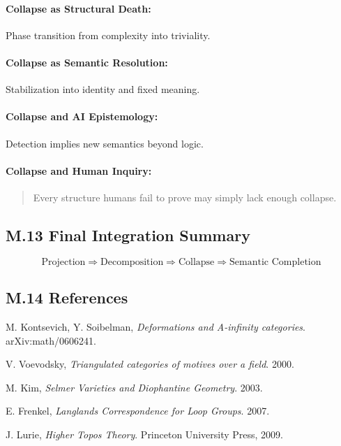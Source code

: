 \documentclass[11pt]{article}
\begin{document}
\begin{axiom}
\begin{axiom}
{{\paragraph{Collapse as Structural Death:}  
Phase transition from complexity into triviality.

\paragraph{Collapse as Semantic Resolution:}  
Stabilization into identity and fixed meaning.

\paragraph{Collapse and AI Epistemology:}  
Detection implies new semantics beyond logic.

\paragraph{Collapse and Human Inquiry:}  
\begin{quote}
Every structure humans fail to prove may simply lack enough collapse.
\end{quote}

\subsection*{M.13 Final Integration Summary}

\[
\text{Projection} \Rightarrow \text{Decomposition} \Rightarrow \text{Collapse} \Rightarrow \text{Semantic Completion}
\]

\subsection*{M.14 References}

\begin{thebibliography}{9}
M. Kontsevich, Y. Soibelman,  
\textit{Deformations and A-infinity categories}. arXiv:math/0606241.

V. Voevodsky,  
\textit{Triangulated categories of motives over a field}. 2000.

M. Kim,  
\textit{Selmer Varieties and Diophantine Geometry}. 2003.

E. Frenkel,  
\textit{Langlands Correspondence for Loop Groups}. 2007.

J. Lurie,  
\textit{Higher Topos Theory}. Princeton University Press, 2009.
\end{thebibliography}



}}
\end{axiom}
\end{axiom}
\end{document}
